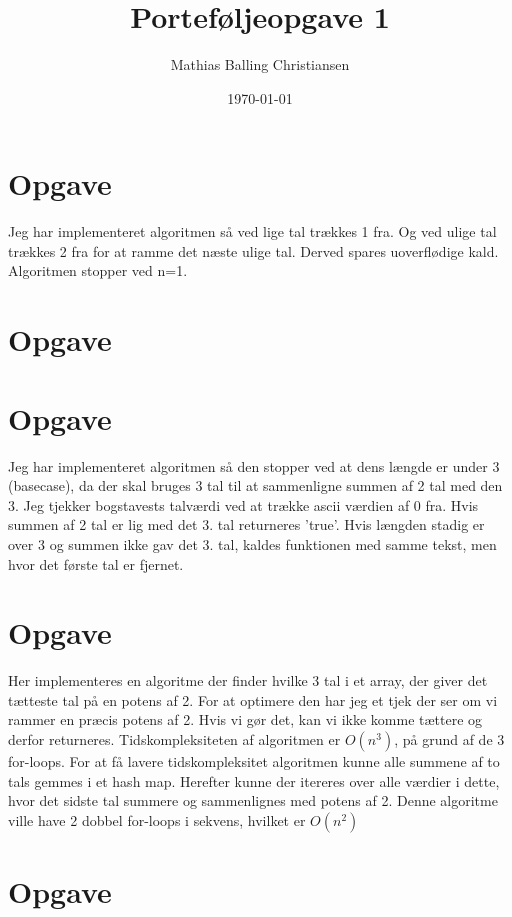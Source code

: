 \documentclass{article}
\title{Porteføljeopgave 1}
\author{Mathias Balling Christiansen}
\date{\today}
\begin{document}
\maketitle
\tableofcontents
\newpage

\section{Opgave} %
Jeg har implementeret algoritmen så ved lige tal trækkes 1 fra. 
Og ved ulige tal trækkes 2 fra for at ramme det næste ulige tal.
Derved spares uoverflødige kald. Algoritmen stopper ved n=1.

\section{Opgave} %

\section{Opgave} %
Jeg har implementeret algoritmen så den stopper ved at dens længde er under 3 (basecase),
da der skal bruges 3 tal til at sammenligne summen af 2 tal med den 3.
Jeg tjekker bogstavests talværdi ved at trække ascii værdien af 0 fra.
Hvis summen af 2 tal er lig med det 3. tal returneres 'true'.
Hvis længden stadig er over 3 og summen ikke gav det 3. tal,
kaldes funktionen med samme tekst, men hvor det første tal er fjernet.

\section{Opgave} %
Her implementeres en algoritme der finder hvilke 3 tal i et array,
der giver det tætteste tal på en potens af 2.
For at optimere den har jeg et tjek der ser om vi rammer en præcis
potens af 2. Hvis vi gør det, kan vi ikke komme tættere og derfor returneres.
Tidskompleksiteten af algoritmen er $O(n^3)$, på grund af de 3 for-loops.
For at få lavere tidskompleksitet algoritmen kunne alle summene af 
to tals gemmes i et hash map. Herefter kunne der itereres over alle
værdier i dette, hvor det sidste tal summere og sammenlignes med potens af 2.
Denne algoritme ville have 2 dobbel for-loops i sekvens, hvilket er $O(n^2)$

\section{Opgave} %
\end{document}
